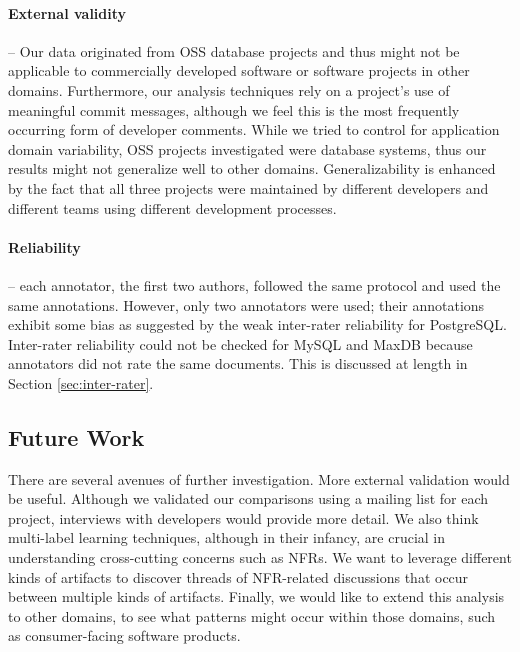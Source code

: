 \documentclass[smallextended]{svjour3}       %
\begin{document}
\paragraph{External validity} -- %
Our data originated from OSS database projects and thus might not be applicable to commercially developed software or software projects in other domains. 
Furthermore, our analysis techniques rely on a project's use of meaningful commit messages, although we feel this is the most frequently occurring form
of developer comments. 
While we tried to control for application domain variability, OSS
projects investigated were database systems, thus our results might
not generalize well to other domains. Generalizability is enhanced by
the fact that all three projects
were maintained by different developers and different teams using
different development processes.


\paragraph{Reliability} -- each annotator, the first two authors, followed the same protocol and used the same annotations. 
However, only two annotators were used; their annotations exhibit some
bias as suggested by the weak inter-rater reliability for
PostgreSQL. Inter-rater reliability could not be checked for MySQL and
MaxDB because annotators did not rate the same documents. This is discussed at length in Section \ref{sec:inter-rater}.

\subsection{Future Work}
There are several avenues of further investigation.  
More external validation would be useful. 
Although we validated our comparisons using a mailing list for each project, interviews with developers would provide more detail. 
We also think multi-label learning techniques, although in their infancy, are crucial in understanding cross-cutting concerns such as NFRs. 
We want to leverage different kinds of artifacts to discover threads of NFR-related discussions that occur between multiple kinds of artifacts.
Finally, we would like to extend this analysis to other domains, to
see what patterns might occur within those domains, such as consumer-facing software products.
\end{document}
